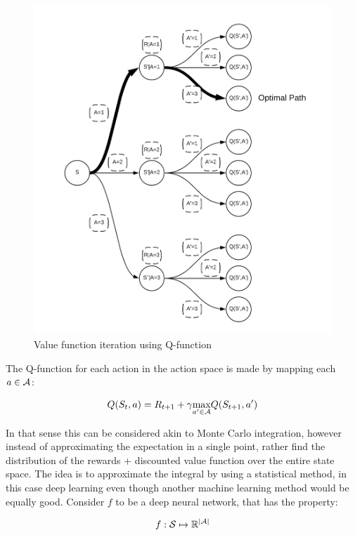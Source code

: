 \begin{figure}[ht]
    \centering
    \includegraphics[scale=0.15]{figures/vfi_figure.png}
    \caption{Value function iteration using Q-function}
    \label{fig:vfi_figure}
\end{figure}

The Q-function for each action in the action space is made by mapping each $a\in \mathcal{A}$:

\begin{equation}
 Q(S_t, a) = R_{t+1} + \gamma \underset{a'\in \mathcal{A}}{\max} Q(S_{t+1}, a')
\end{equation}

In that sense this can be considered akin to Monte Carlo integration, however instead of approximating the expectation in a single point, rather find the distribution of the rewards + discounted value function over the entire state space. The idea is to approximate the integral by using a statistical method, in this case deep learning even though another machine learning method would be equally good. Consider $f$ to be a deep neural network, that has the property:

\begin{equation}
    f: \mathcal{S} \mapsto\mathbb{R}^{\mid \mathcal{A} \mid}
\end{equation}

